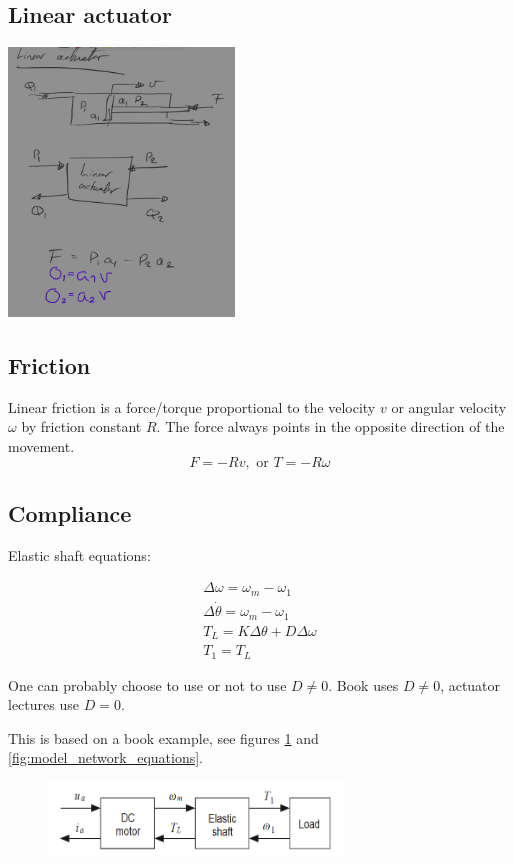 \subsection{Linear actuator}

\includegraphics[width=6cm]{figures/linearactuator_MODSIM.png}

\subsection{Friction}
Linear friction is a force/torque proportional to the velocity $v$ or angular velocity $\omega$ by friction constant $R$. The force always points in the opposite direction of the movement.
$$
F=-Rv, \text{ or } T=-R\omega
$$

\subsection{Compliance}

Elastic shaft equations: 

\begin{equation}
\begin{aligned}
    \Delta \omega = \omega_m - \omega_1 \\
    \Delta \dot\theta  = \omega_m - \omega_1 \\
    T_L = K\Delta\theta + D\Delta\omega \\
    T_1 = T_L
\end{aligned}
\end{equation}

One can probably choose to use or not to use $D\neq0$. Book uses $D\neq0$, actuator lectures use $D=0$.

This is based on a book example, see figures \ref{fig:model_network} and \ref{fig:model_network_equations}.
\begin{figure}[H]
    \centering
\includegraphics[width=0.7\textwidth]{figures/model_network.PNG}
    \caption{}
    \label{fig:model_network}
\end{figure}


